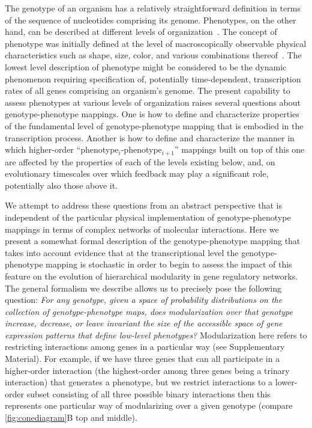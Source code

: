 The genotype of an organism has a relatively straightforward definition in terms of the sequence of nucleotides comprising its genome. Phenotypes, on the other hand, can be described at different levels of organization~\cite{Dawkins1982,Stadler2001}. The concept of phenotype was initially defined at the level of macroscopically observable physical characteristics such as shape, size, color, and various combinations thereof~\cite{Johannsen1911}. The lowest level description of phenotype might be considered to be the dynamic phenomenon requiring specification of, potentially time-dependent, transcription rates of all genes comprising an organism's genome. The present capability to assess phenotypes at various levels of organization raises several questions about genotype-phenotype mappings. One is how to define and characterize properties of the fundamental level of genotype-phenotype mapping that is embodied in the transcription process. Another is how to define and characterize the manner in which higher-order ``phenotype$_i$-phenotype$_{i+1}$'' mappings built on top of this one are affected by the properties of each of the levels existing below, and, on evolutionary timescales over which feedback may play a significant role, potentially also those above it.

We attempt to address these questions from an abstract perspective that is independent of the particular physical implementation of genotype-phenotype mappings in terms of complex networks of molecular interactions. Here we present a somewhat formal description of the genotype-phenotype mapping that takes into account evidence that at the transcriptional level the genotype-phenotype mapping is stochastic \cite{Swain2002,Paulsson2004,Thattai2004,Acar2008a,Lestas2010,So2011,Munsky2012,Neuert2013,Sanchez2013} in order to begin to assess the impact of this feature on the evolution of hierarchical modularity in gene regulatory networks. The general formalism we describe allows us to precisely pose the following question: \emph{For any genotype, given a space of probability distributions on the collection of genotype-phenotype maps, does modularization over that genotype increase, decrease, or leave invariant the size of the accessible space of gene expression patterns that define low-level phenotypes?} Modularization here refers to restricting interactions among genes in a particular way (see Supplementary Material). For example, if we have three genes that can all participate in a higher-order interaction (the highest-order among three genes being a trinary interaction) that generates a phenotype, but we restrict interactions to a lower-order subset consisting of all three possible binary interactions then this represents one particular way of modularizing over a given genotype (compare \ref{fig:conediagram}B top and middle).


